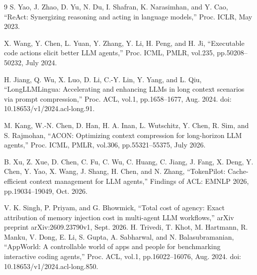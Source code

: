 \begin{thebibliography}{9}
S. Yao, J. Zhao, D. Yu, N. Du, I. Shafran, K. Narasimhan, and Y. Cao,
``ReAct: Synergizing reasoning and acting in language models,''
Proc. ICLR, May 2023.

X. Wang, Y. Chen, L. Yuan, Y. Zhang, Y. Li, H. Peng, and H. Ji,
``Executable code actions elicit better LLM agents,''
Proc. ICML, PMLR, vol.235, pp.50208--50232, July 2024.

H. Jiang, Q. Wu, X. Luo, D. Li, C.-Y. Lin, Y. Yang, and L. Qiu,
``LongLLMLingua: Accelerating and enhancing LLMs in long context scenarios via prompt compression,''
Proc. ACL, vol.1, pp.1658--1677, Aug. 2024.
doi: 10.18653/v1/2024.acl-long.91.

M. Kang, W.-N. Chen, D. Han, H. A. Inan, L. Wutschitz, Y. Chen,
R. Sim, and S. Rajmohan,
``ACON: Optimizing context compression for long-horizon LLM agents,''
Proc. ICML, PMLR, vol.306, pp.55321--55375, July 2026.

B. Xu, Z. Xue, D. Chen, C. Fu, C. Wu, C. Huang, C. Jiang, J. Fang,
X. Deng, Y. Chen, Y. Yao, X. Wang, J. Shang, H. Chen, and N. Zhang,
``TokenPilot: Cache-efficient context management for LLM agents,''
Findings of ACL: EMNLP 2026, pp.19034--19049, Oct. 2026.

V. K. Singh, P. Priyam, and G. Bhowmick,
``Total cost of agency: Exact attribution of memory injection cost in multi-agent LLM workflows,''
arXiv preprint arXiv:2609.23790v1, Sept. 2026.
H. Trivedi, T. Khot, M. Hartmann, R. Manku, V. Dong, E. Li, S. Gupta,
A. Sabharwal, and N. Balasubramanian,
``AppWorld: A controllable world of apps and people for benchmarking interactive coding agents,''
Proc. ACL, vol.1, pp.16022--16076, Aug. 2024.
doi: 10.18653/v1/2024.acl-long.850.

\end{thebibliography}
